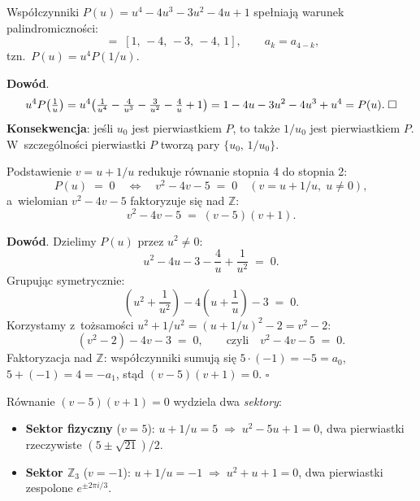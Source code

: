 \begin{proposition}\label{prop:T2-palindrome}
Wsp\'o\l{}czynniki $P(u) = u^4 - 4u^3 - 3u^2 - 4u + 1$ spe\l{}niaj\k{a}
warunek palindromiczno\'sci:
\begin{equation}
  [a_4, a_3, a_2, a_1, a_0] \;=\; [1,\,-4,\,-3,\,-4,\,1],
  \qquad a_k = a_{4-k},
\end{equation}
tzn.\ $P(u) = u^4 P(1/u)$.

\textbf{Dow\'od}.
\[
  u^4 P\!\left(\tfrac{1}{u}\right)
    = u^4\!\left(\tfrac{1}{u^4} - \tfrac{4}{u^3} - \tfrac{3}{u^2}
      - \tfrac{4}{u} + 1\right)
    = 1 - 4u - 3u^2 - 4u^3 + u^4
    = P(u). \;\hfill\square
\]
\textbf{Konsekwencja}: je\'sli $u_0$ jest pierwiastkiem $P$, to tak\.ze
$1/u_0$ jest pierwiastkiem $P$.
W~szczeg\'olno\'sci pierwiastki $P$ tworz\k{a} pary
$\{u_0,\, 1/u_0\}$.
\end{proposition}

\begin{theorem}\label{thm:T2-reduction}
Podstawienie $v = u + 1/u$ redukuje r\'ownanie stopnia 4 do stopnia 2:
\begin{equation}\label{eq:T2-vred}
  P(u) \;=\; 0 \quad\Longleftrightarrow\quad
  v^2 - 4v - 5 \;=\; 0
  \quad (v = u + 1/u,\; u \neq 0),
\end{equation}
a~wielomian $v^2-4v-5$ faktoryzuje si\k{e} nad $\mathbb{Z}$:
\begin{equation}\label{eq:T2-vfactor}
  v^2 - 4v - 5 \;=\; (v-5)(v+1).
\end{equation}

\textbf{Dow\'od}.
Dzielimy $P(u)$ przez $u^2 \neq 0$:
\[
  u^2 - 4u - 3 - \frac{4}{u} + \frac{1}{u^2} \;=\; 0.
\]
Grupuj\k{a}c symetrycznie:
\[
  \left(u^2 + \frac{1}{u^2}\right) - 4\!\left(u + \frac{1}{u}\right) - 3
  \;=\; 0.
\]
Korzystamy z~to\.zsamo\'sci $u^2+1/u^2 = (u+1/u)^2 - 2 = v^2-2$:
\[
  (v^2 - 2) - 4v - 3 \;=\; 0,
  \qquad\text{czyli}\quad
  v^2 - 4v - 5 \;=\; 0.
\]
Faktoryzacja nad $\mathbb{Z}$: wsp\'o\l{}czynniki sumuj\k{a} si\k{e}
$5 \cdot (-1) = -5 = a_0$, $5 + (-1) = 4 = -a_1$, st\k{a}d
$(v-5)(v+1) = 0$.
\hfill$\square$
\end{theorem}

\begin{remark}\label{rem:T2-sectors}
R\'ownanie $(v-5)(v+1)=0$ wydziela dwa \emph{sektory}:
\begin{itemize}
  \item \textbf{Sektor fizyczny} ($v=5$):
        $u + 1/u = 5 \;\Rightarrow\; u^2 - 5u + 1 = 0$,
        dwa pierwiastki rzeczywiste $(5\pm\sqrt{21})/2$.
  \item \textbf{Sektor $\mathbb{Z}_3$} ($v=-1$):
        $u + 1/u = -1 \;\Rightarrow\; u^2 + u + 1 = 0$,
        dwa pierwiastki zespolone $e^{\pm 2\pi i/3}$.
\end{itemize}
\end{remark}


